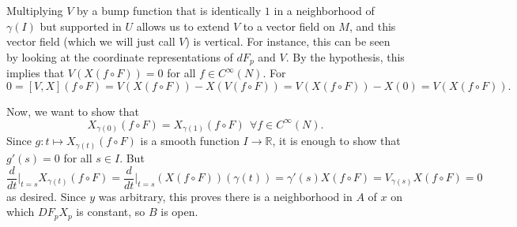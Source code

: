 \documentclass[10pt,letter]{article}
\begin{document}
\begin{enumerate}[label=(\alph*)]
Multiplying $V$ by a bump function that is identically $1$ in a neighborhood of $\gamma(I)$ but supported in $U$ allows us to extend $V$ to a vector field on $M$, and this vector field (which we will just call $V$) is vertical. For instance, this can be seen by looking at the coordinate representations of $dF_p$ and $V$. By the hypothesis, this implies that $V(X(f \circ F)) = 0$ for all $f \in C^{\infty}(N)$. For \[ 0 = [V,X](f \circ F) = V(X(f \circ F)) - X(V(f \circ F)) = V(X(f \circ F)) - X(0) = V(X(f \circ F)). \]

Now, we want to show that \[ X_{\gamma(0)}(f \circ F) = X_{\gamma(1)}(f \circ F) \ \  \forall f \in C^{\infty}(N). \] Since $g: t \mapsto X_{\gamma(t)}(f \circ F)$ is a smooth function $I \rightarrow \mathbb{R}$, it is enough to show that $g'(s) = 0$ for all $s \in I$. But \[ \frac{d}{dt}\bigg \vert_{t=s} X_{\gamma(t)}(f \circ F) =  \frac{d}{dt}\bigg \vert_{t=s} (X(f \circ F))(\gamma(t)) = \gamma'(s) X(f \circ F) = V_{\gamma(s)} X(f \circ F) = 0  \]
as desired. Since $y$ was arbitrary, this proves there is a neighborhood in $A$ of $x$ on which $DF_p X_p$ is constant, so $B$ is open.  

\end{enumerate}
\end{document}
